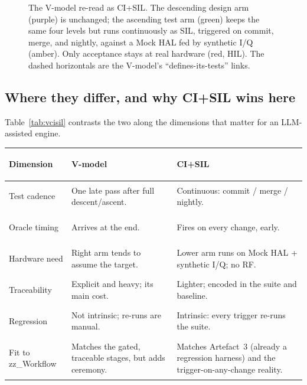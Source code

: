 \documentclass[11pt,a4paper]{article}
\begin{document}
\begin{figure}[htbp]
{}
\caption{The V-model re-read as CI+SIL. The descending design arm (purple) is unchanged;
the ascending test arm (green) keeps the same four levels but runs continuously as SIL,
triggered on commit, merge, and nightly, against a Mock HAL fed by synthetic I/Q (amber).
Only acceptance stays at real hardware (red, HIL). The dashed horizontals are the
V-model's ``defines-its-tests'' links.}
\label{fig:vmodel}
\end{figure}

\subsection{Where they differ, and why CI+SIL wins here}

Table~\ref{tab:vcisil} contrasts the two along the dimensions that matter for an
LLM-assisted engine.

\begin{table}[htbp]
\centering
\caption{V-model versus CI+SIL on the dimensions relevant to zz\_Workflow.}
\label{tab:vcisil}
\small
{}
\begin{longtable}{@{}>{\bfseries\raggedright}p{30mm}>{\raggedright}p{52mm}>{\raggedright\arraybackslash}p{52mm}@{}}
\rowcolor{headbg}\textbf{Dimension} & \textbf{V-model} & \textbf{CI+SIL}\\
\endhead
Test cadence & One late pass after full descent/ascent. & Continuous: commit / merge / nightly.\\
Oracle timing & Arrives at the end. & Fires on every change, early.\\
Hardware need & Right arm tends to assume the target. & Lower arm runs on Mock HAL + synthetic I/Q; no RF.\\
Traceability & Explicit and heavy; its main cost. & Lighter; encoded in the suite and baseline.\\
Regression & Not intrinsic; re-runs are manual. & Intrinsic: every trigger re-runs the suite.\\
Fit to zz\_Workflow & Matches the gated, traceable stages, but adds ceremony. & Matches Artefact~3 (already a regression harness) and the trigger-on-any-change reality.\\
\end{longtable}
\end{table}
\end{document}
